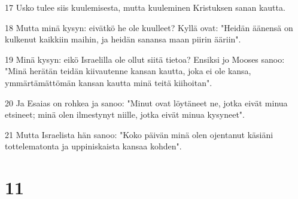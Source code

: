 \par 17 Usko tulee siis kuulemisesta, mutta kuuleminen Kristuksen sanan kautta.
\par 18 Mutta minä kysyn: eivätkö he ole kuulleet? Kyllä ovat: "Heidän äänensä on kulkenut kaikkiin maihin, ja heidän sanansa maan piirin ääriin".
\par 19 Minä kysyn: eikö Israelilla ole ollut siitä tietoa? Ensiksi jo Mooses sanoo: "Minä herätän teidän kiivautenne kansan kautta, joka ei ole kansa, ymmärtämättömän kansan kautta minä teitä kiihoitan".
\par 20 Ja Esaias on rohkea ja sanoo: "Minut ovat löytäneet ne, jotka eivät minua etsineet; minä olen ilmestynyt niille, jotka eivät minua kysyneet".
\par 21 Mutta Israelista hän sanoo: "Koko päivän minä olen ojentanut käsiäni tottelematonta ja uppiniskaista kansaa kohden".

\chapter{11}

